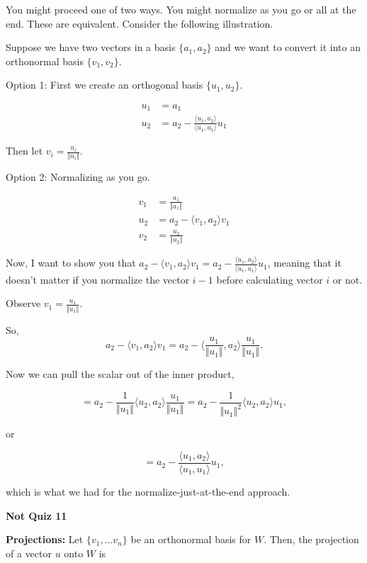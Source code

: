 \documentclass{article}
\begin{document}
You might proceed one of two ways. You might normalize as you go or all at the end. These are equivalent. Consider the following illustration. 


Suppose we have two vectors in a basis $\{a_1, a_2\}$ and we want to convert it into an orthonormal basis $\{v_1, v_2\}$.

Option 1: First we create an orthogonal basis $\{u_1, u_2\}$. 

\begin{align*}
u_1 &= a_1\\
u_2 &= a_2 - \frac{\langle u_1, a_2\rangle}{\langle u_1, u_1\rangle} u_1
\end{align*}

Then let $v_i = \frac{u_i}{\Vert u_i \Vert}$.

Option 2: Normalizing as you go. 

\begin{align*}
v_1 &= \frac{a_1}{\Vert a_1 \Vert}\\
u_2 &= a_2 - \langle v_1, a_2\rangle v_1\\
v_2 &= \frac{u_2}{\Vert u_2\Vert}
\end{align*}

Now, I want to show you that $a_2 - \langle v_1, a_2\rangle v_1 = a_2 - \frac{\langle u_1, a_2\rangle}{\langle u_1, u_1\rangle} u_1$, meaning that it doesn't matter if you normalize the vector $i-1$ before calculating vector $i$ or not.

Observe $v_1 = \frac{u_1}{\Vert u_1\Vert}$.

So, $$a_2 - \langle v_1, a_2\rangle v_1 = a_2 - \langle \frac{u_1}{\Vert u_1\Vert}, a_2\rangle \frac{u_1}{\Vert u_1\Vert}. $$

Now we can pull the scalar out of the inner product, 

$$ = a_2 - \frac{1}{\Vert u_1\Vert}\langle u_2, a_2\rangle \frac{u_1}{\Vert u_1\Vert} = a_2 - \frac{1}{\Vert u_1\Vert^2}\langle u_2, a_2\rangle u_1,$$

or

$$ = a_2 - \frac{\langle u_1, a_2\rangle}{\langle u_1, u_1\rangle} u_1,$$

which is what we had for the normalize-just-at-the-end approach.

\pagebreak

\textbf{Not Quiz 11}

\bigskip{}

\textbf{Projections:} Let $\{v_1, ... v_n\}$ be an orthonormal basis for $W$. Then, the projection of a vector $u$ onto $W$ is
\end{document}

